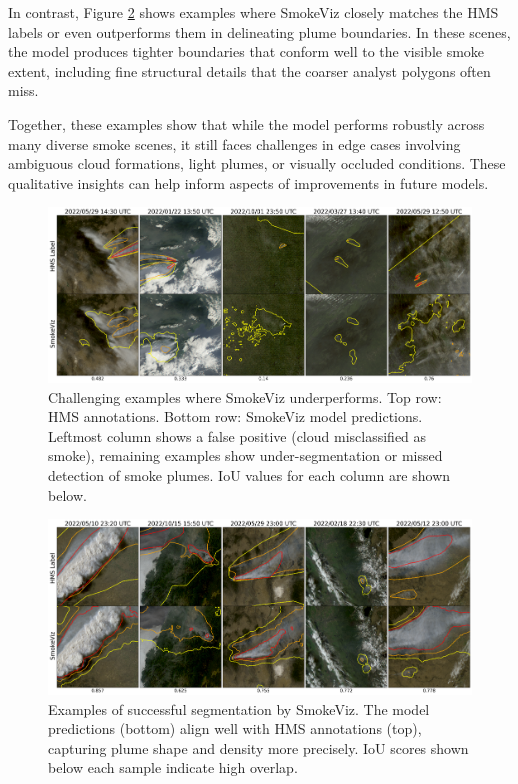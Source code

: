 \documentclass{article}
\begin{document}
In contrast, Figure \ref{good} shows examples where SmokeViz closely matches the HMS labels or even outperforms them in delineating plume boundaries. In these scenes, the model produces tighter boundaries that conform well to the visible smoke extent, including fine structural details that the coarser analyst polygons often miss.

Together, these examples show that while the model performs robustly across many diverse smoke scenes, it still faces challenges in edge cases involving ambiguous cloud formations, light plumes, or visually occluded conditions. These qualitative insights can help inform aspects of improvements in future models.

\begin{figure}[!htb]
    \centering
    \includegraphics[width=\linewidth]{stat_figs/bad_results.png}
    \caption{Challenging examples where SmokeViz underperforms. Top row: HMS annotations. Bottom row: SmokeViz model predictions. Leftmost column shows a false positive (cloud misclassified as smoke), remaining examples show under-segmentation or missed detection of smoke plumes. IoU values for each column are shown below.}
    \label{poor}
\end{figure}


\begin{figure}[!htb]
    \centering
    \includegraphics[width=\linewidth]{stat_figs/good_results.png}
    \caption{Examples of successful segmentation by SmokeViz. The model predictions (bottom) align well with HMS annotations (top), capturing plume shape and density more precisely. IoU scores shown below each sample indicate high overlap.}
    \label{good}
\end{figure}
\end{document}
